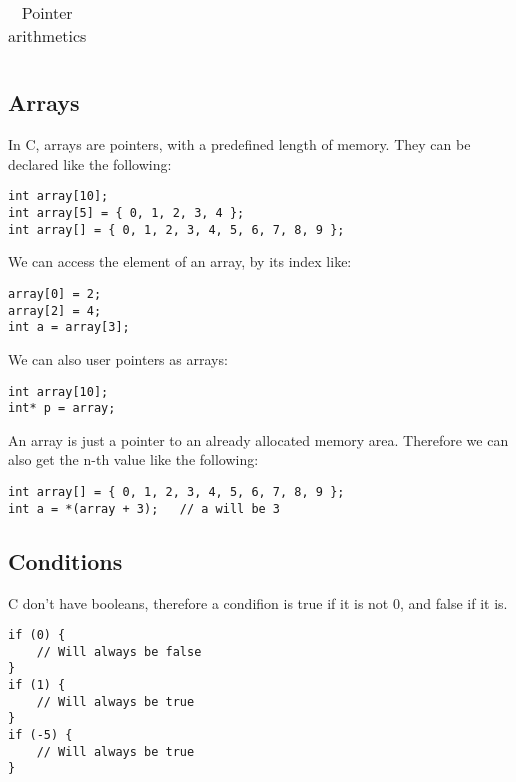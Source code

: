 \begin{table}[h]
\begin{tabular}{|p{}|p{}|}
    \end{tabular}
    \caption{Pointer arithmetics}\label{table:pointer-arythmetics}
\end{table}


\newpage
\subsection{Arrays}\label{sec:c-arrays}
In C, arrays are pointers, with a predefined length of memory.
They can be declared like the following:

\begin{lstlisting}[style=CStyle,caption={Array declaration}]
int array[10];
int array[5] = { 0, 1, 2, 3, 4 };
int array[] = { 0, 1, 2, 3, 4, 5, 6, 7, 8, 9 };

\end{lstlisting}

We can access the element of an array, by its index like:

\begin{lstlisting}[style=CStyle,caption={Array use}]
array[0] = 2;
array[2] = 4;
int a = array[3];

\end{lstlisting}

We can also user pointers as arrays:

\begin{lstlisting}[style=CStyle,caption={Pointer of an array}]
int array[10];
int* p = array;

\end{lstlisting}

An array is just a pointer to an already allocated memory area. Therefore we can also get the n-th value like the following:

\begin{lstlisting}[style=CStyle,caption={Array with pointer arithmetics}]
int array[] = { 0, 1, 2, 3, 4, 5, 6, 7, 8, 9 };
int a = *(array + 3);   // a will be 3

\end{lstlisting}


\newpage
\subsection{Conditions}
C don't have booleans, therefore a condifion is true if it is not 0, and false if it is.

\begin{lstlisting}[style=CStyle,caption={Conditions}]
if (0) {
    // Will always be false
}
if (1) {
    // Will always be true
}
if (-5) {
    // Will always be true
}

\end{lstlisting}

